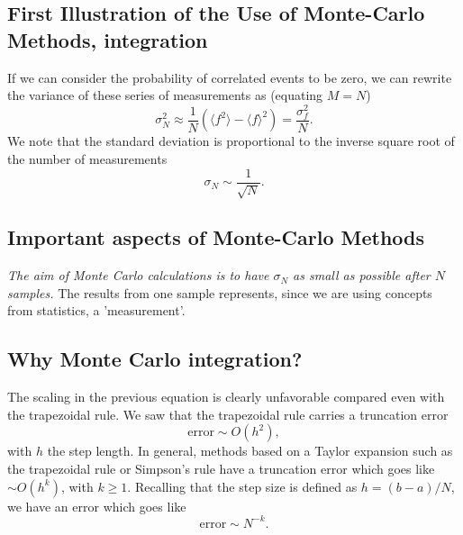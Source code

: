 \documentclass[%
oneside,                 %
final,                   %
10pt]{article}
\newenvironment{block_mdfboxadmon}[1][]{
\begin{block_mdfboxmdframed}[frametitle=#1]
}
{
\end{block_mdfboxmdframed}
}
\begin{document}
\subsection{First Illustration of the Use of Monte-Carlo Methods, integration}

\begin{block_mdfboxadmon}[]
If we can consider the probability of 
correlated events to be zero, we can rewrite
the variance of these series of measurements as (equating $M=N$)
\begin{equation}
  \sigma^2_N\approx \frac{1}{N}\left(\langle f^2\rangle - 
                                 \langle f \rangle^2\right)=\frac{\sigma^2_f}{N}.
\label{eq:sigmaN}
\end{equation}
We note that the standard deviation is proportional to the inverse square root of 
the number of measurements
\begin{equation*}
   \sigma_N \sim \frac{1}{\sqrt{N}}.
\end{equation*}
\end{block_mdfboxadmon} %




\subsection{Important aspects of Monte-Carlo Methods}

\begin{block_mdfboxadmon}[]
\emph{The aim of Monte Carlo calculations is to have $\sigma_N$ as small as possible after $N$ samples. }
The results from one  sample represents, 
since we are using concepts from statistics,
a 'measurement'.
\end{block_mdfboxadmon} %



\subsection{Why Monte Carlo integration?}

\begin{block_mdfboxadmon}[]
The scaling in the previous equation 
is clearly unfavorable compared even with the 
trapezoidal rule. We saw that the trapezoidal
rule carries a truncation error 
\[
\mathrm{error}\sim O(h^2),
\]
with $h$ the step length.
In general, methods based on a Taylor expansion such as the trapezoidal
rule or Simpson's rule have a truncation
error which goes like $\sim O(h^k)$, with $k \ge 1$. 
Recalling that the step size is defined as $h=(b-a)/N$, we have an
error which goes like 
\[
\mathrm{error}\sim N^{-k}.  
\]
\end{block_mdfboxadmon} %
\end{document}
